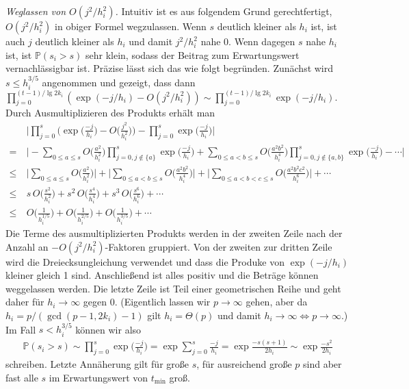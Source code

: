 \documentclass[a4paper, 11pt, ngerman]{article}
\renewcommand{\P}{\mathbb{P}}
\begin{document}
\emph{Weglassen von $O(j^2/h_i^2)$.} Intuitiv ist es aus folgendem Grund gerechtfertigt, $O(j^2/h_i^2)$ in obiger Formel wegzulassen. Wenn $s$ deutlich kleiner als $h_i$ ist, ist auch $j$ deutlich kleiner als $h_i$ und damit $j^2/h_i^2$ nahe 0. Wenn dagegen $s$ nahe $h_i$ ist, ist $\P(s_i > s)$ sehr klein, sodass der Beitrag zum Erwartungswert vernachlässigbar ist. Präzise lässt sich das wie folgt begründen. Zunächst wird $s \le h_{i}^{3/5}$ angenommen und gezeigt, dass dann $\prod_{j = 0}^{(t-1) / \lg 2k_i} (\exp (-j/h_i) - O (j^2/h_i^2)) \sim \prod_{j = 0}^{(t-1) / \lg 2k_i} \exp (-j/h_i)$. Durch Ausmultiplizieren des Produkts erhält man
\begin{align*}
        & \ \Bigg \vert
    \prod_{j = 0}^{s} \Bigg ( \exp \bigg ( \frac {-j}{h_i} \bigg )
    - O \bigg ( \frac {j^2} {h_i^2} \bigg ) \Bigg )
    - \prod_{j = 0}^{s} \exp \bigg ( \frac {-j}{h_i} \bigg )
    \Bigg \vert          \\
    =   & \ \Bigg \vert
    - \sum_{0 \le a \le s} O \bigg ( \frac {a^2} {h_i^2} \bigg )
    \prod_{j = 0, j \notin \{a\}}^{s} \exp \bigg ( \frac {-j}{h_i} \bigg )
    + \sum_{0 \le a < b \le s} O \bigg ( \frac {a^2b^2} {h_i^4} \bigg )
    \prod_{j = 0, j \notin \{a, b\}}^{s}
    \exp \bigg ( \frac {-j}{h_i} \bigg ) - \cdots
    \Bigg \vert          \\
    \le & \ \Bigg \vert
    \sum_{0 \le a \le s} O \bigg ( \frac {a^2} {h_i^2} \bigg )
    \Bigg \vert + \Bigg \vert
    \sum_{0 \le a < b \le s} O \bigg ( \frac {a^2b^2} {h_i^4} \bigg )
    \Bigg \vert + \Bigg \vert
    \sum_{0 \le a < b < c \le s} O \bigg ( \frac {a^2b^2c^2} {h_i^6} \bigg )
    \Bigg \vert + \cdots \\
    \le & \
    s \, O \bigg ( \frac {s^2} {h_i^2} \bigg )
    +s^2 \, O \bigg ( \frac {s^4} {h_i^4} \bigg )
    +     s^3 \,  O \bigg ( \frac {s^6} {h_i^6} \bigg )
    + \cdots             \\
    \le & \
    O \bigg ( \frac 1 {h_i^{1/5}} \bigg )
    + O \bigg ( \frac 1 {h_i^{2/5}} \bigg )
    + O \bigg ( \frac 1 {h_i^{3/5}} \bigg )
    + \cdots
\end{align*}
Die Terme des ausmultiplizierten Produkts werden in der zweiten Zeile nach der Anzahl an $-O(j^2/h_i^2)$-Faktoren gruppiert. Von der zweiten zur dritten Zeile wird die Dreiecksungleichung verwendet und dass die Produke von $\exp(-j/h_i)$ kleiner gleich 1 sind. Anschließend ist alles positiv und die Beträge können weggelassen werden. Die letzte Zeile ist Teil einer geometrischen Reihe und geht daher für $h_i \to \infty$ gegen 0. (Eigentlich lassen wir $p \to \infty$ gehen, aber da $h_i = p/(\gcd(p - 1, 2k_i) - 1)$ gilt $h_i = \Theta(p)$ und damit $h_i \to \infty \Longleftrightarrow p \to \infty$.) Im Fall $s < h_i^{3/5}$ können wir also
\begin{align*}
    \P(s_i > s)
    \sim \prod_{j = 0}^{s} \exp \bigg ( \frac {-j}{h_i} \bigg )
    =\exp \sum_{j = 0}^{s} \frac {-j} {h_i}
    = \exp \frac {-s (s + 1)} {2h_i}
    \sim \exp \frac {-s^2} {2h_i}
\end{align*}
schreiben. Letzte Annäherung gilt für große $s$, für ausreichend große $p$ sind aber fast alle $s$ im Erwartungswert von $t_{\min}$ groß.
\end{document}
